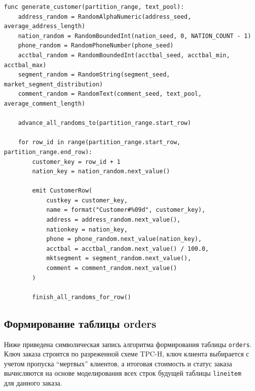 \begin{lstlisting}[caption={Формирование таблицы customer}]
func generate_customer(partition_range, text_pool):
    address_random = RandomAlphaNumeric(address_seed, average_address_length)
    nation_random = RandomBoundedInt(nation_seed, 0, NATION_COUNT - 1)
    phone_random = RandomPhoneNumber(phone_seed)
    acctbal_random = RandomBoundedInt(acctbal_seed, acctbal_min, acctbal_max)
    segment_random = RandomString(segment_seed, market_segment_distribution)
    comment_random = RandomText(comment_seed, text_pool, average_comment_length)

    advance_all_randoms_to(partition_range.start_row)

    for row_id in range(partition_range.start_row, partition_range.end_row):
        customer_key = row_id + 1
        nation_key = nation_random.next_value()

        emit CustomerRow(
            custkey = customer_key,
            name = format("Customer#%09d", customer_key),
            address = address_random.next_value(),
            nationkey = nation_key,
            phone = phone_random.next_value(nation_key),
            acctbal = acctbal_random.next_value() / 100.0,
            mktsegment = segment_random.next_value(),
            comment = comment_random.next_value()
        )

        finish_all_randoms_for_row()
\end{lstlisting}

\subsection{Формирование таблицы orders}

Ниже приведена символическая запись алгоритма формирования таблицы
\texttt{orders}. Ключ заказа строится по разреженной схеме TPC-H, ключ клиента
выбирается с учетом пропуска ``мертвых'' клиентов, а итоговая стоимость и статус
заказа вычисляются на основе моделирования всех строк будущей таблицы
\texttt{lineitem} для данного заказа.

